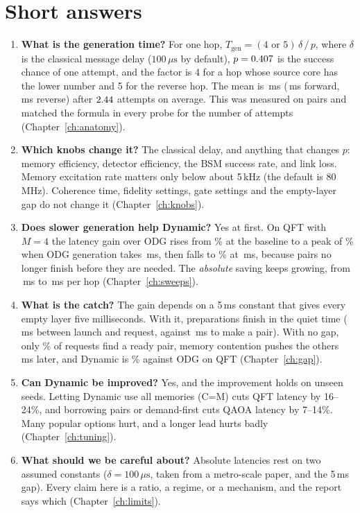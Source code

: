 \documentclass[11pt,a4paper]{report}
\newcommand{\ms}{\,ms}
\newcommand{\us}{\,\ensuremath{\mu\mathrm{s}}}
\begin{document}
\section{Short answers}
\begin{enumerate}
\item \textbf{What is the generation time?} For one hop, $T_{\text{gen}} = (4\text{ or }5)\,\delta\,/\,p$, where $\delta$ is the classical message delay ($100\us{}$ by default), $p=0.407{}$ is the success chance of one attempt, and the factor is 4 for a hop whose source core has the lower number and 5 for the reverse hop. The mean is \BaseGenMean{}\ms{} (\BaseGenForward{}\ms{} forward, \BaseGenReverse{}\ms{} reverse) after $2.44{}$ attempts on average. This was measured on \LinkPairs{} pairs and matched the formula in every probe for the number of attempts (Chapter~\ref{ch:anatomy}).
\item \textbf{Which knobs change it?} The classical delay, and anything that changes $p$: memory efficiency, detector efficiency, the BSM success rate, and link loss. Memory excitation rate matters only below about 5\,kHz (the default is 80\,MHz). Coherence time, fidelity settings, gate settings and the empty-layer gap do not change it (Chapter~\ref{ch:knobs}).
\item \textbf{Does slower generation help Dynamic?} Yes at first. On QFT with $M=4$ the latency gain over ODG rises from \BaseQftFourGain{}\% at the baseline to a peak of \PeakQftFourGain{}\% when ODG generation takes \PeakQftFourGen{}\ms{}, then falls to \LowQftFourGain{}\% at \LowQftFourGen{}\ms{}, because pairs no longer finish before they are needed. The \emph{absolute} saving keeps growing, from \BaseQftFourSaving{}\ms{} to \LowQftFourSaving{}\ms{} per hop (Chapter~\ref{ch:sweeps}).
\item \textbf{What is the catch?} The gain depends on a 5\ms{} constant that gives every empty layer five milliseconds. With it, preparations finish in the quiet time (\FunnelSlackFive{}\ms{} between launch and request, against \FunnelPrep{}\ms{} to make a pair). With no gap, only \FunnelHitZero{}\% of requests find a ready pair, memory contention pushes the others \FunnelMissWaitZero{}\ms{} later, and Dynamic is \QftGapZeroGain{}\% against ODG on QFT (Chapter~\ref{ch:gap}).
\item \textbf{Can Dynamic be improved?} Yes, and the improvement holds on unseen seeds. Letting Dynamic use all memories (C=M) cuts QFT latency by 16--24\%, and borrowing pairs or demand-first cuts QAOA latency by 7--14\%. Many popular options hurt, and a longer lead hurts badly (Chapter~\ref{ch:tuning}).
\item \textbf{What should we be careful about?} Absolute latencies rest on two assumed constants ($\delta=100\us{}$, taken from a metro-scale paper, and the 5\ms{} gap). Every claim here is a ratio, a regime, or a mechanism, and the report says which (Chapter~\ref{ch:limits}).
\end{enumerate}
\end{document}
